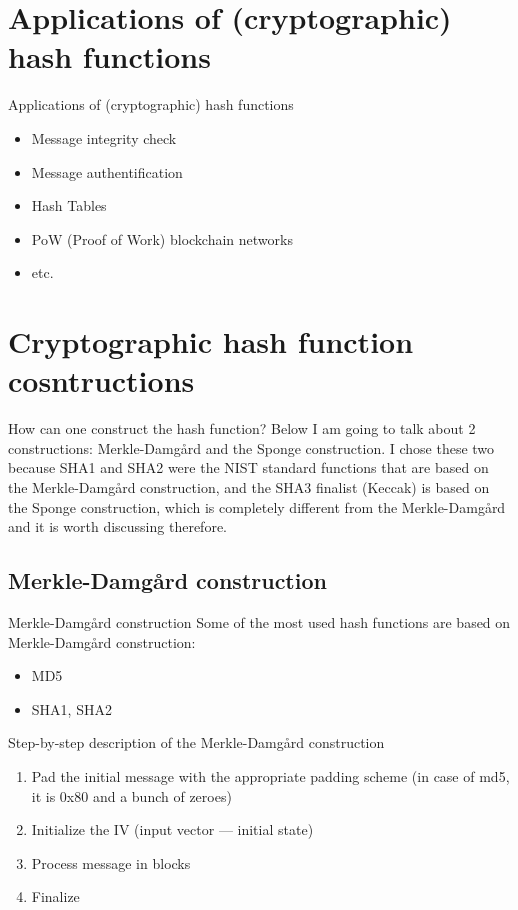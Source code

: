 \documentclass{beamer}
\begin{document}
\section{Applications of (cryptographic) hash functions}

\begin{frame}{Applications of (cryptographic) hash functions}
    \begin{itemize}
        \item Message integrity check
        \item Message authentification
        \item Hash Tables
        \item PoW (Proof of Work) blockchain networks
        \item etc.
    \end{itemize}
\end{frame}

\section{Cryptographic hash function cosntructions}

\begin{frame}{How can one construct the hash function?}
    Below I am going to talk about 2 constructions: Merkle-Damgård and the
    Sponge construction. I chose these two because SHA1 and SHA2 were the NIST
    standard functions that are based on the Merkle-Damgård construction, and
    the SHA3 finalist (Keccak) is based on the Sponge construction, which is
    completely different from the Merkle-Damgård and it is worth discussing
    therefore.
\end{frame}

\subsection{Merkle-Damgård construction}

\begin{frame}{Merkle-Damgård construction}
    Some of the most used hash functions are based on Merkle-Damgård
    construction:
    \begin{itemize}
        \item MD5
        \item SHA1, SHA2
    \end{itemize}
\end{frame}

\begin{frame}{Step-by-step description of the Merkle-Damgård construction}
    \begin{enumerate}
        \item Pad the initial message with the appropriate padding scheme
        (in case of md5, it is 0x80 and a bunch of zeroes)
        \item Initialize the IV (input vector --- initial state)
        \item Process message in blocks
        \item Finalize
    \end{enumerate}
\end{frame}
\end{document}
